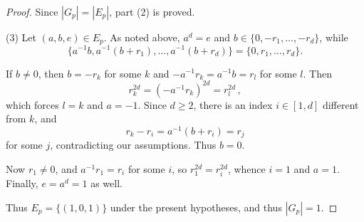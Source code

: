 \documentclass[12pt]{amsart}
\theoremstyle{plain}
\numberwithin{theorem}{section}
\numberwithin{equation}{theorem}
\theoremstyle{definition}
\begin{document}
\begin{proof}
Since $|G_p| = |E_p| $, part (2) is proved.

(3) Let $(a,b,e) \in E_p$.  As noted above, $a^d = e$ and $b \in \{0,-r_1,\dots,-r_d\}$, while
$$
\{ a^{-1}b, a^{-1}(b+r_1), \dots, a^{-1}(b+r_d) \} = \{0,r_1,\dots,r_d\}.
$$

If $b \ne 0$, then $b = - r_k$ for some $k$ and $- a^{-1} r_k = a^{-1}b = r_l$ for some $l$.  Then
$$
r_k^{2d} = (- a^{-1} r_k)^{2d} = r_l^{2d} \,,
$$
which forces $l=k$ and $a = -1$.  Since $d \ge 2$, there is an index $i \in [1,d]$ different from $k$, and
$$
r_k - r_i = a^{-1}(b+r_i) = r_j
$$
for some $j$, contradicting our assumptions.  Thus $b=0$.

Now $r_1 \ne 0$, and $a^{-1} r_1 = r_i$ 
for some $i$, so $r_1^{2d} = r_i^{2d}$, 
whence $i=1$ and $a=1$.  Finally, 
$e = a^d = 1$ as well.

Thus $E_p = \{(1,0,1)\}$ under the 
present hypotheses, and thus $|G_p| = 1$.
\end{proof}
\end{document}
